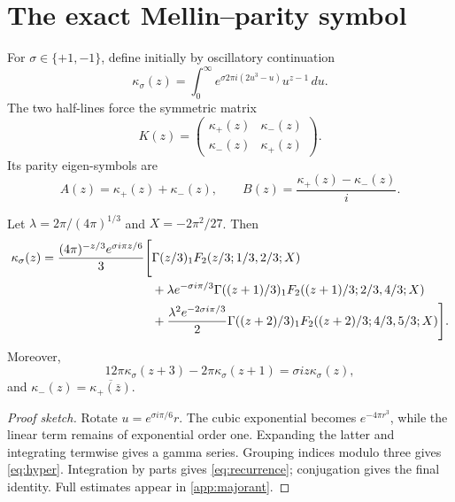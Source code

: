 \section{The exact Mellin--parity symbol}

For $\sigma\in\{+1,-1\}$, define initially by oscillatory continuation
\begin{equation}\label{eq:kappa}
\kappa_\sigma(z)=\int_0^\infty
e^{\sigma2\pi i(2u^3-u)}u^{z-1}\,du.
\end{equation}
The two half-lines force the symmetric matrix
\begin{equation}\label{eq:K}
K(z)=\begin{pmatrix}\kappa_+(z)&\kappa_-(z)\\
\kappa_-(z)&\kappa_+(z)\end{pmatrix}.
\end{equation}
Its parity eigen-symbols are
\begin{equation}\label{eq:AB}
A(z)=\kappa_+(z)+\kappa_-(z),\qquad
B(z)=\frac{\kappa_+(z)-\kappa_-(z)}{i}.
\end{equation}

\begin{proposition}\label{prop:continuation}
Let $\lambda=2\pi/(4\pi)^{1/3}$ and $X=-2\pi^2/27$. Then
\begin{align}
\kappa_\sigma(z)
=\frac{(4\pi)^{-z/3}e^{\sigma i\pi z/6}}3\Bigg[&
\Gamma(z/3){}_1F_2(z/3;1/3,2/3;X)\notag\\
&+\lambda e^{-\sigma i\pi/3}\Gamma((z+1)/3)
{}_1F_2((z+1)/3;2/3,4/3;X)\notag\\
&+\frac{\lambda^2e^{-2\sigma i\pi/3}}2
\Gamma((z+2)/3){}_1F_2((z+2)/3;4/3,5/3;X)
\Bigg].\label{eq:hyper}
\end{align}
Moreover,
\begin{equation}\label{eq:recurrence}
12\pi\kappa_\sigma(z+3)-2\pi\kappa_\sigma(z+1)
=\sigma iz\kappa_\sigma(z),
\end{equation}
and $\kappa_-(z)=\overline{\kappa_+(\overline z)}$.
\end{proposition}

\begin{proof}[Proof sketch]
Rotate $u=e^{\sigma i\pi/6}r$. The cubic exponential becomes
$e^{-4\pi r^3}$, while the linear term remains of exponential order one.
Expanding the latter and integrating termwise gives a gamma series. Grouping
indices modulo three gives \eqref{eq:hyper}. Integration by parts gives
\eqref{eq:recurrence}; conjugation gives the final identity. Full estimates
appear in \cref{app:majorant}.
\end{proof}

